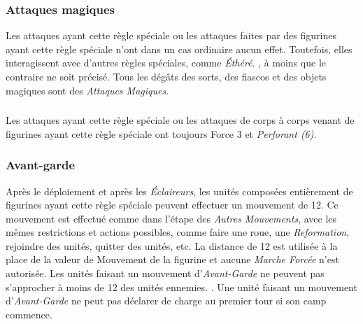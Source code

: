 \subsubsection*{Attaques magiques}

Les attaques ayant cette règle spéciale ou les attaques faites par des figurines ayant cette règle spéciale n'ont dans un cas ordinaire aucun effet. Toutefois, elles interagissent avec d'autres règles spéciales, comme \emph{Éthéré}. , à moins que le contraire ne soit précisé. Tous les dégâts des sorts, des fiascos et des objets magiques sont des \emph{Attaques Magiques}.

\subsubsection*{}

Les attaques ayant cette règle spéciale ou les attaques de corps à corps venant de figurines ayant cette règle spéciale ont toujours Force 3 et \emph{Perforant (6)}.

\subsubsection*{Avant-garde}

Après le déploiement et après les \emph{Éclaireurs}, les unités composées entièrement de figurines ayant cette règle spéciale peuvent effectuer un mouvement de 12{\pouce}. Ce mouvement est effectué comme dans l'étape des \emph{Autres Mouvements}, avec les mêmes restrictions et actions possibles, comme faire une roue, une \emph{Reformation}, rejoindre des unités, quitter des unités, etc. La distance de 12{\pouce} est utilisée à la place de la valeur de Mouvement de la figurine et aucune \emph{Marche Forcée} n'est autorisée. Les unités faisant un mouvement d'\emph{Avant-Garde} ne peuvent pas s'approcher à moins de 12{\pouce} des unités ennemies. . Une unité faisant un mouvement d'\emph{Avant-Garde} ne peut pas déclarer de charge au premier tour si son camp commence.  

